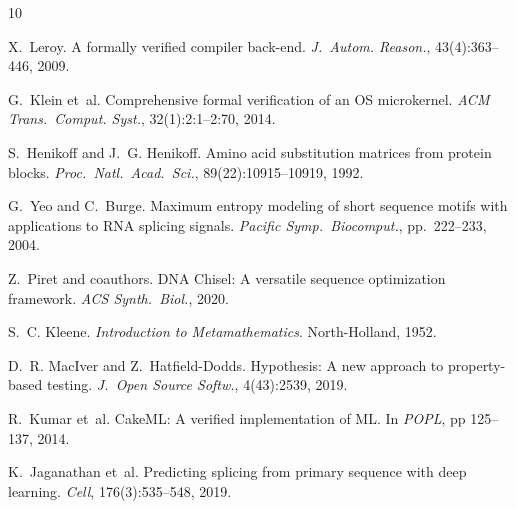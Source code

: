 
\begin{thebibliography}{10}

X.~Leroy.
\newblock A formally verified compiler back-end.
\newblock \emph{J.~Autom. Reason.}, 43(4):363--446, 2009.

G.~Klein et~al.
\newblock Comprehensive formal verification of an OS microkernel.
\newblock \emph{ACM Trans.~Comput. Syst.}, 32(1):2:1--2:70, 2014.

S.~Henikoff and J.~G. Henikoff.
\newblock Amino acid substitution matrices from protein blocks.
\newblock \emph{Proc.~Natl.~Acad.~Sci.}, 89(22):10915--10919, 1992.

G.~Yeo and C.~Burge.
\newblock Maximum entropy modeling of short sequence motifs with
applications to RNA splicing signals.
\newblock \emph{Pacific Symp.~Biocomput.}, pp.~222--233, 2004.

Z.~Piret and coauthors.
\newblock DNA Chisel: A versatile sequence optimization framework.
\newblock \emph{ACS Synth.~Biol.}, 2020.

S.~C. Kleene.
\newblock \emph{Introduction to Metamathematics}.
\newblock North-Holland, 1952.

D.~R. MacIver and Z.~Hatfield-Dodds.
\newblock Hypothesis: A new approach to property-based testing.
\newblock \emph{J.~Open Source Softw.}, 4(43):2539, 2019.

R.~Kumar et~al.
\newblock CakeML: A verified implementation of ML.
\newblock In \emph{POPL}, pp 125--137, 2014.

K.~Jaganathan et~al.
\newblock Predicting splicing from primary sequence with deep learning.
\newblock \emph{Cell}, 176(3):535--548, 2019.

\end{thebibliography}

